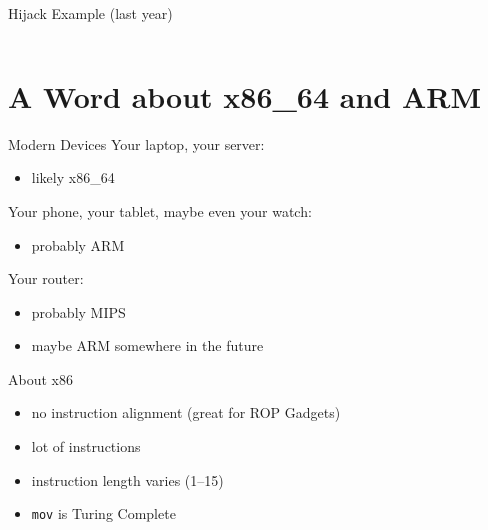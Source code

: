 \documentclass[beamer]{uibk}
\begin{document}
\begin{frame}[t,fragile]{Hijack Example (last year)}
    \begin{columns}
        \begin{column}{0.75\textwidth}
        \end{column}
        \begin{column}{0.25\textwidth}
        \end{column}
    \end{columns}
\end{frame}

\section{A Word about x86\_64 and ARM}

\begin{frame}{Modern Devices}
    Your laptop, your server:
    \begin{itemize}
        \item likely x86\_64
    \end{itemize}
    \medskip
    \pause
    Your phone, your tablet, maybe even your watch:
    \begin{itemize}
        \item probably ARM
    \end{itemize}
    \medskip
    \pause
    Your router:
    \begin{itemize}
        \item probably MIPS
        \item maybe ARM somewhere in the future
    \end{itemize}
\end{frame}

\begin{frame}{About x86}
    \begin{itemize}
        \item no instruction alignment (great for ROP Gadgets)
        \item lot of instructions
        \item instruction length varies (\SIrange{1}{15}{\byte})
        \item \texttt{mov} is Turing Complete
    \end{itemize}
\end{frame}
\end{document}
